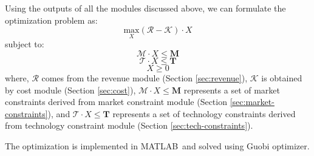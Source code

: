 Using the outputs of all the modules discussed above,  we can formulate the optimization problem as:
\begin{equation*}
\underset{X}{\text{max}} \left( \mathcal{R} - \mathcal{K} \right) \cdot X
\end{equation*}
subject to:
\begin{equation*}
\mathcal{M} \cdot X \leq \mathbf{M}
\end{equation*}
\begin{equation*}
\mathcal{T} \cdot X \leq \mathbf{T}
\end{equation*}
\begin{equation*}
X \geq 0
\end{equation*}
where, $\mathcal{R}$ comes from the revenue module (Section \ref{sec:revenue}), $\mathcal{K}$ is obtained by cost module (Section \ref{sec:cost}), $\mathcal{M} \cdot X \leq \mathbf{M}$ represents a set of market constraints derived from market constraint module (Section \ref{sec:market-constraints}), and $\mathcal{T} \cdot X \leq \mathbf{T}$ represents a set of technology constraints derived from technology constraint module (Section \ref{sec:tech-constraints}). 

The optimization is implemented in MATLAB\textcopyright~and solved using Guobi optimizer. 

